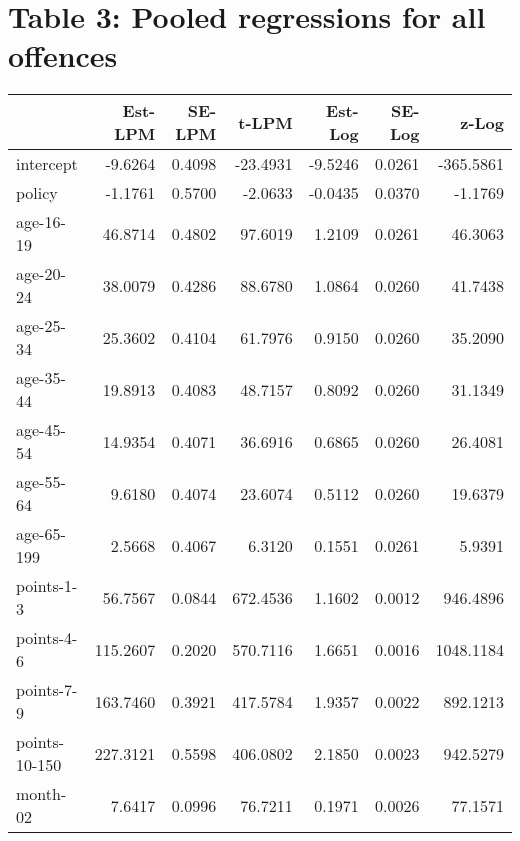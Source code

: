 \documentclass[10pt]{article}
\begin{document}






\section{Table 3: Pooled regressions for all offences}




\begin{table}[ht]
\centering
\begin{tabular}{lrrrrrr}
  \hline
 & Est-LPM & SE-LPM & t-LPM & Est-Log & SE-Log & z-Log \\ 
  \hline
intercept & -9.6264 & 0.4098 & -23.4931 & -9.5246 & 0.0261 & -365.5861 \\ 
  policy & -1.1761 & 0.5700 & -2.0633 & -0.0435 & 0.0370 & -1.1769 \\ 
  age-16-19 & 46.8714 & 0.4802 & 97.6019 & 1.2109 & 0.0261 & 46.3063 \\ 
  age-20-24 & 38.0079 & 0.4286 & 88.6780 & 1.0864 & 0.0260 & 41.7438 \\ 
  age-25-34 & 25.3602 & 0.4104 & 61.7976 & 0.9150 & 0.0260 & 35.2090 \\ 
  age-35-44 & 19.8913 & 0.4083 & 48.7157 & 0.8092 & 0.0260 & 31.1349 \\ 
  age-45-54 & 14.9354 & 0.4071 & 36.6916 & 0.6865 & 0.0260 & 26.4081 \\ 
  age-55-64 & 9.6180 & 0.4074 & 23.6074 & 0.5112 & 0.0260 & 19.6379 \\ 
  age-65-199 & 2.5668 & 0.4067 & 6.3120 & 0.1551 & 0.0261 & 5.9391 \\ 
  points-1-3 & 56.7567 & 0.0844 & 672.4536 & 1.1602 & 0.0012 & 946.4896 \\ 
  points-4-6 & 115.2607 & 0.2020 & 570.7116 & 1.6651 & 0.0016 & 1048.1184 \\ 
  points-7-9 & 163.7460 & 0.3921 & 417.5784 & 1.9357 & 0.0022 & 892.1213 \\ 
  points-10-150 & 227.3121 & 0.5598 & 406.0802 & 2.1850 & 0.0023 & 942.5279 \\ 
  month-02 & 7.6417 & 0.0996 & 76.7211 & 0.1971 & 0.0026 & 77.1571 \\ 

\end{tabular}
\end{table}
\end{document}
